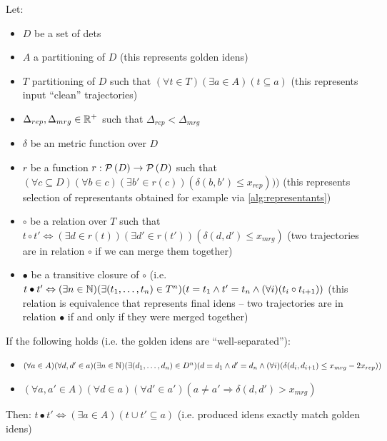 \begin{claim}
\label{clm:claim}
Let:

\setlength{\itemsep}{0pt}
\setlength{\parskip}{0pt}

\begin{itemize}
    \item $D$ be a set of \glspl{det}
    \item $A$ a partitioning of $D$ (this represents golden \glspl{iden})
    \item $T$ partitioning of $D$ such that $(\forall t \in T) (\exists a \in A) (t \subseteq a)$ (this represents input ``clean'' trajectories)
    \item $\Delta_{rep}, \Delta_{mrg} \in \mathbb{R}^+$ such that $\Delta_{rep} < \Delta_{mrg}$
    \item $\delta$ be an metric function over $D$
    \item $r$ be a function $r: \mathcal{P}\left(D\right) \rightarrow \mathcal{P}\left(D\right)$ such that $(\forall c \subseteq D) (\forall b \in c) (\exists b' \in r(c)) (\delta(b, b') \leq x_{rep})))$ (this represents selection of representants obtained for example via \autoref{alg:representants})
    \item $\circ$ be a relation over $T$ such that $t\circ t' \Leftrightarrow (\exists d \in r(t)) (\exists d' \in r(t')) (\delta(d, d') \leq x_{mrg})$ (two trajectories are in relation $\circ$ if we can merge them together)
    \item $\bullet$ be a transitive closure of $\circ$ (i.e. $t \bullet t' \Leftrightarrow (\exists n \in \mathbb{N}) (\exists (t_1, \ldots, t_n) \in T^n) (t = t_1 \land t' = t_n \land (\forall i) (t_i\circ t_{i+1}))$ (this relation is equivalence that represents final \glspl{iden} -- two trajectories are in relation $\bullet$ if and only if they were merged together)
\end{itemize}

If the following holds (i.e. the golden \glspl{iden} are ``well-separated''):
\begin{itemize}
    \item $(\forall a \in A)(\forall d, d' \in a) (\exists n \in \mathbb{N}) (\exists (d_1, \ldots, d_n) \in D^n) (d = d_1 \land d' = d_n \land (\forall i) (\delta(d_i, d_{i+1}) \leq x_{mrg} - 2x_{rep}))$
    \item $(\forall a, a' \in A) (\forall d \in a) (\forall d' \in a') (a \neq a' \Rightarrow \delta(d, d') > x_{mrg})$
\end{itemize}

Then: $t\bullet t' \Leftrightarrow (\exists a \in A) (t \cup t' \subseteq a)$ (i.e. produced \glspl{iden} exactly match golden \glspl{iden})


\end{claim}
